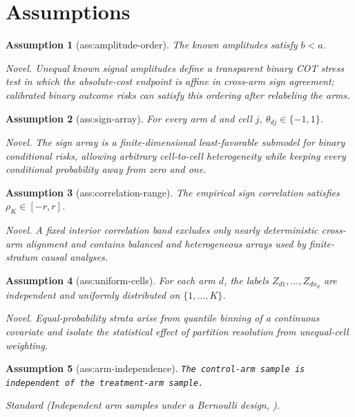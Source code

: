 \documentclass{article}
\newtheorem{assumption}{Assumption}
\begin{document}
\section{Assumptions}

\begin{assumption}[ass:amplitude-order]\label{ass:amplitude-order}
The known amplitudes satisfy \(b<a\).
\par\smallskip\noindent\emph{Novel.} Unequal known signal amplitudes define a transparent binary COT stress test in which the absolute-cost endpoint is affine in cross-arm sign agreement; calibrated binary outcome risks can satisfy this ordering after relabeling the arms.
\end{assumption}

\begin{assumption}[ass:sign-array]\label{ass:sign-array}
For every arm \(d\) and cell \(j\), \(\theta_{dj}\in\{-1,1\}\).
\par\smallskip\noindent\emph{Novel.} The sign array is a finite-dimensional least-favorable submodel for binary conditional risks, allowing arbitrary cell-to-cell heterogeneity while keeping every conditional probability away from zero and one.
\end{assumption}

\begin{assumption}[ass:correlation-range]\label{ass:correlation-range}
The empirical sign correlation satisfies \(\rho_K\in[-r,r]\).
\par\smallskip\noindent\emph{Novel.} A fixed interior correlation band excludes only nearly deterministic cross-arm alignment and contains balanced and heterogeneous arrays used by finite-stratum causal analyses.
\end{assumption}

\begin{assumption}[ass:uniform-cells]\label{ass:uniform-cells}
For each arm \(d\), the labels \(Z_{d1},\ldots,Z_{dn_d}\) are independent and uniformly distributed on \(\{1,\ldots,K\}\).
\par\smallskip\noindent\emph{Novel.} Equal-probability strata arise from quantile binning of a continuous covariate and isolate the statistical effect of partition resolution from unequal-cell weighting.
\end{assumption}

\begin{assumption}[ass:arm-independence]\label{ass:arm-independence}
\texttt{The control-\allowbreak{}arm sample is independent of the treatment-\allowbreak{}arm sample.}
\par\smallskip\noindent\emph{Standard} (Independent arm samples under a Bernoulli design, \cite{linGaoBlanchetGlynn2026Causal}).
\end{assumption}
\end{document}
